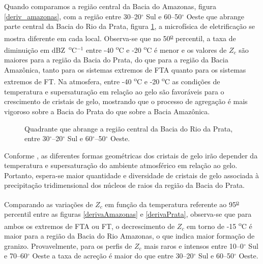 Quando comparamos a região central da Bacia do Amazonas, figura \ref{deriv_amazonas}, com a região entre 30--20$^{\circ}$ Sul e 60--50$^{\circ}$ Oeste que abrange parte central da Bacia do Rio da Prata, figura \ref{deriv_prata}, a microfísica de eletrificação se mostra diferente em cada local. Observa-se que no 50\textsuperscript{\underline{o}} percentil, a taxa de diminuição em dBZ~\textsuperscript{o}C$^{-1}$ entre -40 \textsuperscript{o}C e -20 \textsuperscript{o}C é menor e os valores de $Z_c$ são maiores para a região da Bacia do Prata, do que para a região da Bacia Amazônica, tanto para os sistemas extremos de FTA quanto para os sistemas extremos de FT. Na atmosfera, entre -40 \textsuperscript{o}C e -20 \textsuperscript{o}C as condições de temperatura e supersaturação em relação ao gelo são favoráveis para o crescimento de cristais de gelo, mostrando que o processo de agregação é mais vigoroso sobre a Bacia do Prata do que sobre a Bacia Amazônica.%





\begin{figure}[!ht]
\centering
{}
\caption{Quadrante que abrange a região central da Bacia do Rio da Prata, entre 30$^{\circ}$--20$^{\circ}$ Sul e 60$^{\circ}$--50$^{\circ}$ Oeste.}
\label{deriv_prata}
\end{figure}

Conforme , as diferentes formas geométricas dos cristais de gelo irão depender da temperatura e supersaturação do ambiente atmosférico em relação ao gelo. Portanto, espera-se maior quantidade e diversidade de cristais de gelo associada à precipitação tridimensional dos núcleos de raios  da região da Bacia do Prata.

Comparando as variações de $Z_c$ em função da temperatura referente ao 95\textsuperscript{\underline{o}} percentil entre as figuras \ref{derivaAmazonas} e \ref{derivaPrata}, observa-se que para ambos os extremos de FTA ou FT, o decrescimento de $Z_c$ em torno de -15 \textsuperscript{o}C é maior para a região da Bacia do Rio Amazonas, o que indica maior formação de granizo. Provavelmente, para os perfis de $Z_c$ mais raros e intensos entre 10--0$^{\circ}$ Sul e 70--60$^{\circ}$ Oeste a taxa de acreção é maior do que entre 30--20$^{\circ}$ Sul e 60--50$^{\circ}$ Oeste. 

